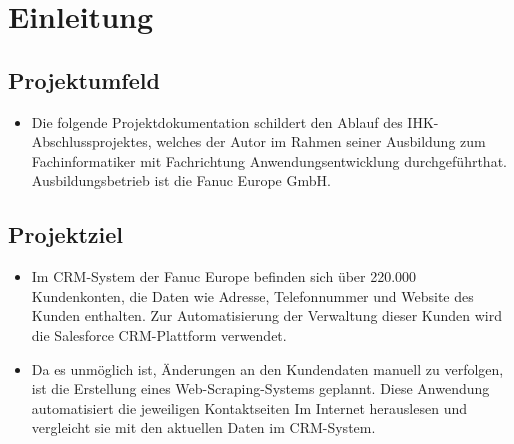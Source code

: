 \section{Einleitung}
\label{sec:Einleitung}


\subsection{Projektumfeld} 
\label{sec:Projektumfeld}
\begin{itemize}
	\item Die folgende Projektdokumentation schildert den Ablauf des IHK-Abschlussprojektes, welches der Autor im Rahmen seiner Ausbildung zum Fachinformatiker mit Fachrichtung Anwendungsentwicklung
	durchgeführthat. Ausbildungsbetrieb ist die Fanuc Europe GmbH.
\end{itemize}

\subsection{Projektziel} 
\label{sec:Projektziel}
\begin{itemize}
	\item Im CRM-System der Fanuc Europe befinden sich über 220.000 Kundenkonten, die Daten wie
	Adresse, Telefonnummer und Website des Kunden enthalten. Zur Automatisierung der
	Verwaltung dieser Kunden wird die Salesforce CRM-Plattform verwendet.
	\item Da es unmöglich ist, Änderungen an den Kundendaten manuell zu verfolgen, ist die Erstellung
	eines Web-Scraping-Systems geplannt. Diese Anwendung automatisiert die jeweiligen
	Kontaktseiten Im Internet herauslesen und vergleicht sie mit den aktuellen Daten im
	CRM-System.
\end{itemize}


